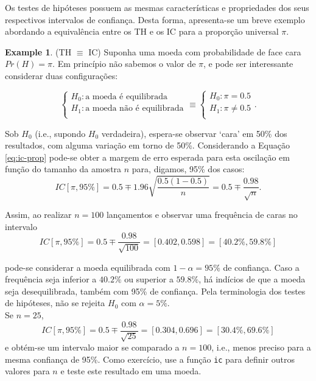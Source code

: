 \documentclass[
]{book}
\theoremstyle{definition}
\theoremstyle{definition}
\newtheorem{example}{Example}[chapter]
\theoremstyle{definition}
\theoremstyle{remark}
\begin{document}
Os testes de hipóteses possuem as mesmas características e propriedades dos seus respectivos intervalos de confiança. Desta forma, apresenta-se um breve exemplo abordando a equivalência entre os TH e os IC para a proporção universal \(\pi\).

\begin{example}
\protect\hypertarget{exm:equ-th-ic}{}{\label{exm:equ-th-ic} }(TH \(\equiv\) IC) Suponha uma moeda com probabilidade de face cara \(Pr(H)=\pi\). Em princípio não sabemos o valor de \(\pi\), e pode ser interessante considerar duas configurações:

\[\left\{ 
    \begin{array}{l}
      H_0: \mbox{a moeda é equilibrada}\\
      H_1: \mbox{a moeda não é equilibrada}\\ \end{array} \right.
    \equiv \left\{ 
    \begin{array}{l}
      H_0: \pi = 0.5 \\
      H_1: \pi \ne 0.5 \\ \end{array} \right. .\]

Sob \(H_{0}\) (i.e., supondo \(H_{0}\) verdadeira), espera-se observar `cara' em 50\% dos resultados, com alguma variação em torno de 50\%. Considerando a Equação \eqref{eq:ic-prop} pode-se obter a margem de erro esperada para esta oscilação em função do tamanho da amostra \(n\) para, digamos, 95\% dos casos: \[ IC \left[ \pi, 95\% \right] = 0.5 \mp 1.96 \sqrt{\dfrac{0.5 \left(1-0.5\right)}{n}} = 0.5 \mp \dfrac{0.98}{\sqrt{n}}. \]

Assim, ao realizar \(n=100\) lançamentos e observar uma frequência de caras no intervalo \[ IC \left[ \pi, 95\% \right]  = 0.5 \mp \dfrac{0.98}{\sqrt{100}} = \left[ 0.402,0.598 \right] = \left[ 40.2\%,59.8\% \right] \]

pode-se considerar a moeda equilibrada com \(1-\alpha=95\%\) de confiança. Caso a frequência seja inferior a \(40.2\%\) ou superior a \(59.8\%\), há indícios de que a moeda seja desequilibrada, também com 95\% de confiança. Pela terminologia dos testes de hipóteses, não se rejeita \(H_{0}\) com \(\alpha=5\%\).\\
Se \(n=25\), \[ IC \left[ \pi, 95\% \right]  = 0.5 \mp \dfrac{0.98}{\sqrt{25}} = \left[ 0.304,0.696 \right] = \left[ 30.4\%,69.6\% \right] \] e obtém-se um intervalo maior se comparado a \(n=100\), i.e., menos preciso para a mesma confiança de 95\%. Como exercício, use a função \texttt{ic} para definir outros valores para \(n\) e teste este resultado em uma moeda.
\end{example}
\end{document}
